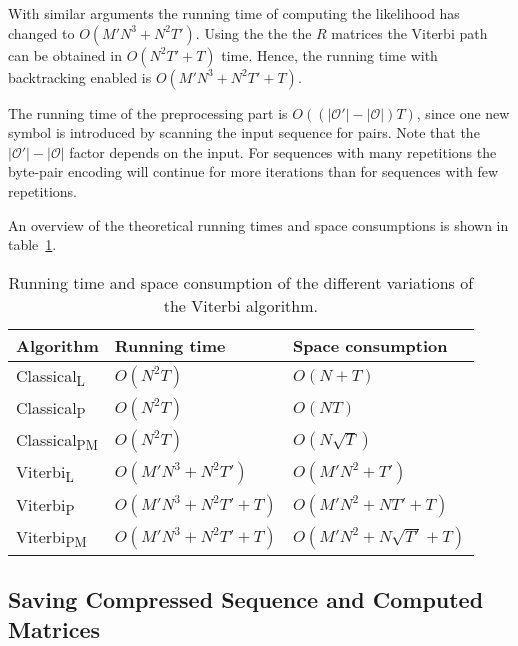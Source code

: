 With similar arguments the running time of computing the likelihood has changed
to $O\left(M' N^3 +N^2 T'\right)$. Using the the the $R$ matrices the Viterbi path can be
obtained in $O\left(N^2 T' + T\right)$ time. Hence, the running time with backtracking
enabled is $O\left(M' N^3 +N^2 T' + T\right)$.

The running time of the preprocessing part is $O\left(
\left(
  \lvert\mathcal{O'}\rvert - \lvert{\mathcal{O}}\rvert
\right) T\right)$, since one new symbol is introduced by scanning the input sequence for
pairs. Note that the $\lvert\mathcal{O'}\rvert - \lvert{\mathcal{O}}\rvert$
factor depends on the input. For sequences with many repetitions the byte-pair
encoding will continue for more iterations than for sequences with few
repetitions.

An overview of the theoretical running times and space consumptions is shown in
table~\ref{tab:running-time}.

\begin{table}
  \centering
  \caption{Running time and space consumption of the different variations of the
    Viterbi algorithm.}
  \label{tab:running-time}
  \begin{tabular}{lll}
    \toprule
    Algorithm                   & Running time             & Space consumption             \\
    \midrule
    Classical\textsubscript{L}  & $O\left(N^2 T\right)$               & $O\left(N + T\right)$                    \\
    Classical\textsubscript{P}  & $O\left(N^2 T\right)$               & $O\left(NT\right)$                       \\
    Classical\textsubscript{PM} & $O\left(N^2 T\right)$               & $O\left(N\sqrt{T}\right)$                \\
    Viterbi\textsubscript{L}    & $O\left(M' N^3 + N^2 T'\right)$     & $O\left(M' N^2 + T'\right)$              \\
    Viterbi\textsubscript{P}    & $O\left(M' N^3 + N^2 T' + T\right)$ & $O\left(M' N^2 + N T' + T\right)$        \\
    Viterbi\textsubscript{PM}   & $O\left(M' N^3 + N^2 T' + T\right)$ & $O\left(M' N^2 + N \sqrt{T'} + T\right)$ \\
    \bottomrule
  \end{tabular}
\end{table}

\subsection{Saving Compressed Sequence and Computed Matrices}
\label{sec:saving-compr-sequ}

